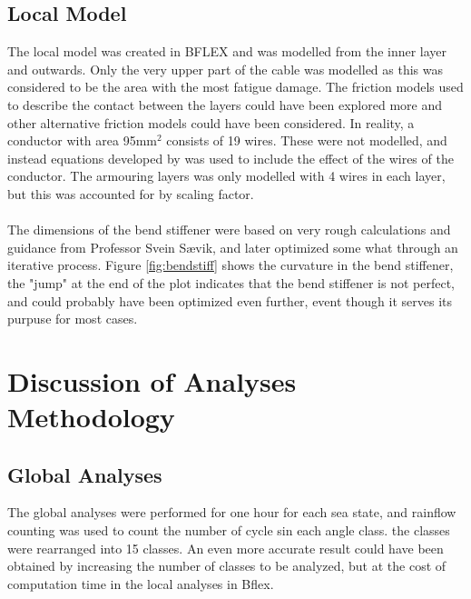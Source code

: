 \subsection{Local Model}
The local model was created in BFLEX and was modelled from the inner layer and outwards. Only the very upper part of the cable was modelled as this was considered to be the area with the most fatigue damage. The friction models used to describe the contact between the layers could have been explored more and other alternative friction models could have been considered. In reality, a conductor with area 95mm$^2$ consists of 19 wires. These were not modelled, and instead equations developed by \cite{s300} was used to include the effect of the wires of the conductor. The armouring layers was only modelled with 4 wires in each layer, but this was accounted for by scaling factor. \\\\The dimensions of the bend stiffener were based on very rough calculations and guidance from Professor Svein Sævik, and later optimized some what through an iterative process. Figure \ref{fig:bendstiff} shows the curvature in the bend stiffener, the "jump" at the end of the plot indicates that the bend stiffener is not perfect, and could probably have been optimized even further, event though it serves its purpuse for most cases. 
\section{Discussion of Analyses Methodology}
\subsection{Global Analyses}
The global analyses were performed for one hour for each sea state, and rainflow counting was used to count the number of cycle sin each angle class. the classes were rearranged into 15 classes. An even more accurate result could have been obtained by increasing the number of classes to be analyzed, but at the cost of computation time in the local analyses in Bflex. 

 
